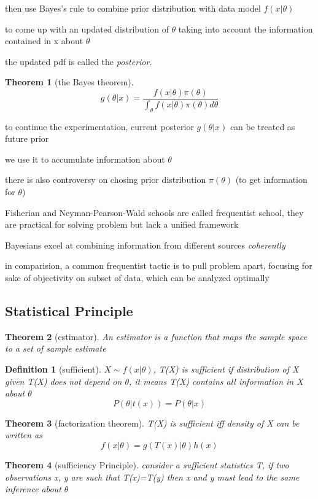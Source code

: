 \documentclass[10pt]{article}
\theoremstyle{break}
\newtheorem{thm}{Theorem}[subsection]
\newtheorem{defn}{Definition}[subsection]
\begin{document}
then use Bayes's rule to combine prior distribution with data model $f(x|\theta)$

to come up with an updated distribution of $\theta$ taking into account the information contained in x about $\theta$

the updated pdf is called the \emph{posterior}.
\begin{thm}[the Bayes theorem]
   $$g(\theta|x)=\frac{f(x|\theta)\pi(\theta)}{
        \int_\theta f(x|\theta)\pi(\theta)d\theta
    }$$
\end{thm}

to continue the experimentation, current posterior $g(\theta|x)$ can be treated as future prior

we use it to accumulate information about $\theta$ 

there is also controversy on chosing prior distribution $\pi(\theta)$ (to get information for $\theta$)

Fisherian and Neyman-Pearson-Wald schools are called frequentist school,
they are practical for solving problem but lack a unified framework

Bayesians excel at combining information from different sources \emph{coherently}

in comparision, a common frequentist tactic is to pull problem apart, focusing for sake of objectivity on subset of data,
which can be analyzed optimally

\subsection{Statistical Principle}

\begin{thm}[estimator]
    An estimator is a function that maps the sample space to a set of sample estimate
\end{thm}

\begin{defn}[sufficient]
    $X\sim f(x|\theta)$, T(X) is sufficient if distribution of X given T(X) does not depend on $\theta$,
    it means T(X) contains all information in X about $\theta$
    $$P(\theta|t(x))=P(\theta|x)$$
\end{defn}

\begin{thm}[factorization theorem]
    T(X) is sufficient iff density of X can be written as 
    $$f(x|\theta) = g(T(x)|\theta)h(x)$$
\end{thm}

\begin{thm}[sufficiency Principle]
    consider a sufficient statistics T, if two observations x, y are such that T(x)=T(y)
    then x and y must lead to the same inference about $\theta$
\end{thm}
\end{document}
